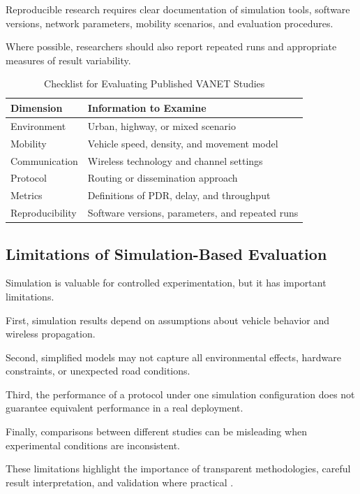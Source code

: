 Reproducible research requires
clear documentation of simulation
tools, software versions,
network parameters, mobility
scenarios, and evaluation
procedures.

Where possible, researchers
should also report repeated
runs and appropriate measures
of result variability.

\begin{table}[htbp]
\centering
\caption{Checklist for Evaluating Published VANET Studies}
\label{tab:study_checklist}
\footnotesize
\begin{tabular}{|p{2.4cm}|p{4.0cm}|}
\hline
\textbf{Dimension} &
\textbf{Information to Examine} \\
\hline
Environment &
Urban, highway, or mixed scenario \\
\hline
Mobility &
Vehicle speed, density, and movement model \\
\hline
Communication &
Wireless technology and channel settings \\
\hline
Protocol &
Routing or dissemination approach \\
\hline
Metrics &
Definitions of PDR, delay, and throughput \\
\hline
Reproducibility &
Software versions, parameters, and repeated runs \\
\hline
\end{tabular}
\end{table}

\subsection{Limitations of Simulation-Based Evaluation}
\label{sec:4G}

Simulation is valuable for
controlled experimentation,
but it has important limitations.

First, simulation results depend
on assumptions about vehicle
behavior and wireless propagation.

Second, simplified models may
not capture all environmental
effects, hardware constraints,
or unexpected road conditions.

Third, the performance of a
protocol under one simulation
configuration does not guarantee
equivalent performance in
a real deployment.

Finally, comparisons between
different studies can be
misleading when experimental
conditions are inconsistent.

These limitations highlight
the importance of transparent
methodologies, careful result
interpretation, and validation
where practical \cite{Sommer2011}.


